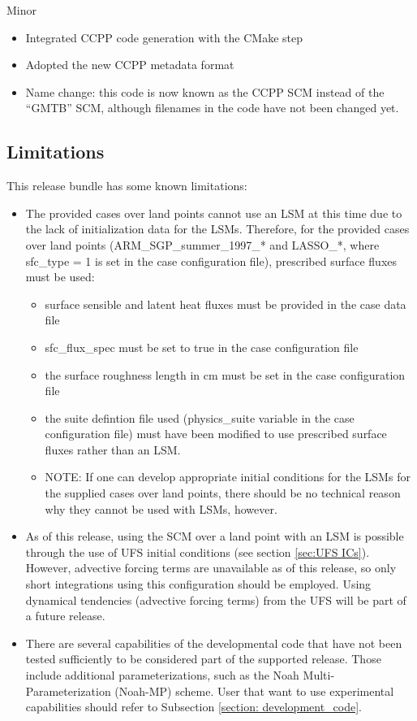 Minor
\begin{itemize}
\item Integrated CCPP code generation with the CMake step
\item Adopted the new CCPP metadata format
\item Name change: this code is now known as the CCPP SCM instead of the ``GMTB'' SCM, although filenames in the code have not been changed yet.
\end{itemize}

\subsection{Limitations}

This release bundle has some known limitations:

\begin{itemize}
\item The provided cases over land points cannot use an LSM at this time due to the lack of initialization data for the LSMs. Therefore, for the provided cases over land points (ARM\_SGP\_summer\_1997\_* and LASSO\_*, where sfc\_type = 1 is set in the case configuration file), prescribed surface fluxes must be used:
\begin{itemize}
\item surface sensible and latent heat fluxes must be provided in the case data file
\item sfc\_flux\_spec must be set to true in the case configuration file
\item the surface roughness length in cm must be set in the case configuration file
\item the suite defintion file used (physics\_suite variable in the case configuration file) must have been modified to use prescribed surface fluxes rather than an LSM.
\item NOTE: If one can develop appropriate initial conditions for the LSMs for the supplied cases over land points, there should be no technical reason why they cannot be used with LSMs, however.
\end{itemize}
\item As of this release, using the SCM over a land point with an LSM is possible through the use of UFS initial conditions (see section \ref{sec:UFS ICs}). However, advective forcing terms are unavailable as of this release, so only short integrations using this configuration should be employed. Using dynamical tendencies (advective forcing terms) from the UFS will be part of a future release.
\item There are several capabilities of the developmental code that have not been tested sufficiently to be considered part of the supported release. Those include additional parameterizations, such as the Noah Multi-Parameterization (Noah-MP) scheme. User that want to use experimental capabilities should refer to Subsection \ref{section: development_code}.
\end{itemize}
